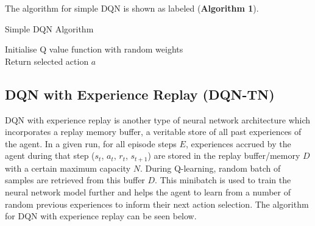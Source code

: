 \documentclass{article}
\begin{document}
The algorithm for simple DQN is shown as labeled (\textbf{Algorithm 1}).

\begin{algorithm}[htbp]
\caption{Simple DQN Algorithm}
\SetAlgoLined
\DontPrintSemicolon
\small %
Initialise Q value function with random weights\;\\
Return selected action $a$\;
\end{algorithm}

\subsection{DQN with Experience Replay (DQN-TN)}
DQN with experience replay is another type of neural network architecture which incorporates a replay memory buffer, a veritable store of all past experiences of the agent. In a given run, for all episode steps $E$, experiences accrued by the agent during that step ($s_t$, $a_t$, $r_t$, $s_{t+1}$) are stored in the replay buffer/memory $D$ with a certain maximum capacity $N$. During Q-learning, random batch of samples are retrieved from this buffer $D$. This minibatch is used to train the neural network model further and helps the agent to learn from a number of random previous experiences to inform their next action selection. The algorithm for DQN with experience replay can be seen below. \footnotemark{} 
\end{document}
